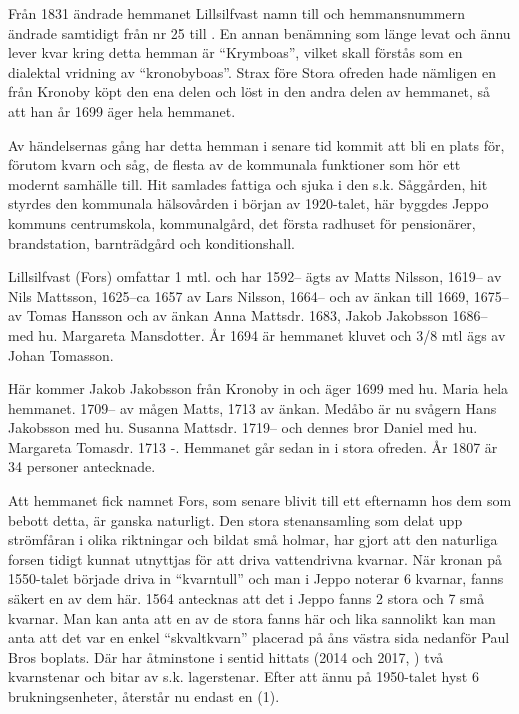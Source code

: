 Från 1831 ändrade hemmanet Lillsilfvast namn till  och hemmansnummern ändrade samtidigt från nr 25  till . En annan benämning som länge levat och ännu lever kvar kring detta hemman är ``Krymboas'', vilket skall förstås som en dialektal vridning  av ``kronobyboas''. Strax före Stora ofreden hade nämligen en  från Kronoby köpt den ena delen och löst in den andra delen av hemmanet, så att han år 1699 äger hela hemmanet.

Av händelsernas gång har detta hemman i senare tid kommit att bli en plats för, förutom kvarn och såg, de flesta av de kommunala funktioner som hör ett modernt samhälle till. Hit samlades fattiga och sjuka i den s.k. Såggården, hit styrdes den kommunala hälsovården i början av 1920-talet, här byggdes Jeppo kommuns centrumskola, kommunalgård, det första radhuset för pensionärer, brandstation, barnträdgård och konditionshall.

Lillsilfvast (Fors) omfattar 1 mtl. och har 1592-- ägts av Matts Nilsson, 1619-- av Nils Mattsson, 1625--ca 1657 av Lars Nilsson, 1664-- och av änkan till 1669, 1675-- av Tomas Hansson och av änkan Anna Mattsdr. 1683, Jakob Jakobsson 1686-- med hu. Margareta Mansdotter. År 1694 är hemmanet kluvet och 3/8 mtl ägs av Johan Tomasson.

Här kommer Jakob Jakobsson från Kronoby in och äger 1699 med hu. Maria hela hemmanet. 1709-- av mågen Matts, 1713 av änkan. Medåbo är nu svågern Hans Jakobsson med hu. Susanna Mattsdr. 1719-- och dennes bror Daniel med hu. Margareta Tomasdr. 1713  -. Hemmanet går sedan in i stora ofreden. År 1807 är 34 personer antecknade.

Att hemmanet fick namnet Fors, som senare blivit till ett efternamn hos dem som bebott detta, är ganska naturligt. Den stora stenansamling som delat upp strömfåran i olika riktningar och bildat små holmar, har gjort att den naturliga forsen tidigt kunnat utnyttjas för att driva vattendrivna kvarnar. När kronan på 1550-talet började driva in ``kvarntull'' och man i Jeppo noterar 6 kvarnar, fanns säkert en av dem här. 1564 antecknas att det i Jeppo fanns 2 stora och 7 små kvarnar. Man kan anta att en av de stora fanns här och lika sannolikt kan man anta att det var en enkel ``skvaltkvarn'' placerad på åns västra sida nedanför Paul Bros boplats. Där har åtminstone i sentid hittats (2014 och 2017, ) två kvarnstenar och bitar av s.k. lagerstenar. Efter att ännu på 1950-talet hyst 6 brukningsenheter, återstår nu endast en (1).


